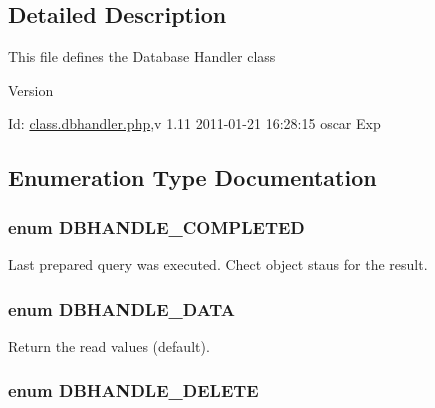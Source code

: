 \subsection{Detailed Description}
This file defines the Database Handler class \begin{DoxyVersion}{Version}

\end{DoxyVersion}
\begin{DoxyParagraph}{Id:}
\hyperlink{class_8dbhandler_8php}{class.dbhandler.php},v 1.11 2011-\/01-\/21 16:28:15 oscar Exp 
\end{DoxyParagraph}


\subsection{Enumeration Type Documentation}
\subsubsection[{DBHANDLE\_\-COMPLETED}]{\setlength{\rightskip}{0pt plus 5cm}enum {\bf DBHANDLE\_\-COMPLETED}}\label{class_8dbhandler_8php_a81abd823ff43027e2a788e4d5993790f}


Last prepared query was executed. Chect object staus for the result. 

\subsubsection[{DBHANDLE\_\-DATA}]{\setlength{\rightskip}{0pt plus 5cm}enum {\bf DBHANDLE\_\-DATA}}\label{class_8dbhandler_8php_acc5178c2a582eafa4ef488ed3394b725}


Return the read values (default). 

\subsubsection[{DBHANDLE\_\-DELETE}]{\setlength{\rightskip}{0pt plus 5cm}enum {\bf DBHANDLE\_\-DELETE}}\label{class_8dbhandler_8php_a978ad3c1b4647dae1fe77c7f8c757da5}


